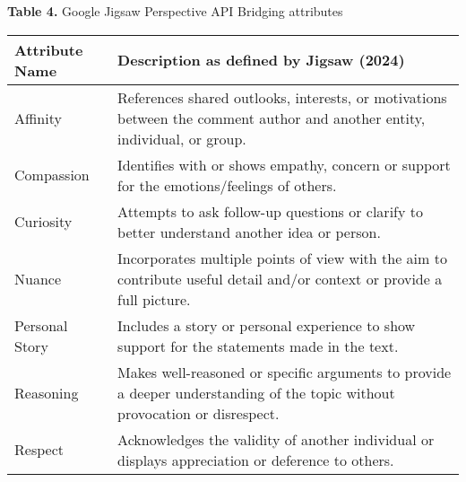\documentclass{article}
\begin{document}
\hspace*{0.5cm}\textbf{Table 4.} Google Jigsaw Perspective API Bridging attributes

\vspace{1em}

\noindent\begin{minipage}{\textwidth}
\fontsize{10}{12}\selectfont  %

\renewcommand{\arraystretch}{1.2}
\begin{tabular}{p{3cm} p{12.5cm}}
\toprule
\textbf{Attribute Name} & \textbf{Description as defined by Jigsaw (2024)} \\
\midrule
Affinity & References shared outlooks, interests, or motivations between the comment author and another entity, individual, or group. \\
\addlinespace[0.7em]
Compassion & Identifies with or shows empathy, concern or support for the emotions/feelings of others. \\
\addlinespace[0.7em]
Curiosity & Attempts to ask follow-up questions or clarify to better understand another idea or person. \\
\addlinespace[0.7em]
Nuance & Incorporates multiple points of view with the aim to contribute useful detail and/or context or provide a full picture. \\
\addlinespace[0.7em]
Personal Story & Includes a story or personal experience to show support for the statements made in the text. \\
\addlinespace[0.7em]
Reasoning & Makes well-reasoned or specific arguments to provide a deeper understanding of the topic without provocation or disrespect. \\
\addlinespace[0.7em]
Respect & Acknowledges the validity of another individual or displays appreciation or deference to others. \\
\bottomrule
\end{tabular}
\end{minipage}
\end{document}
